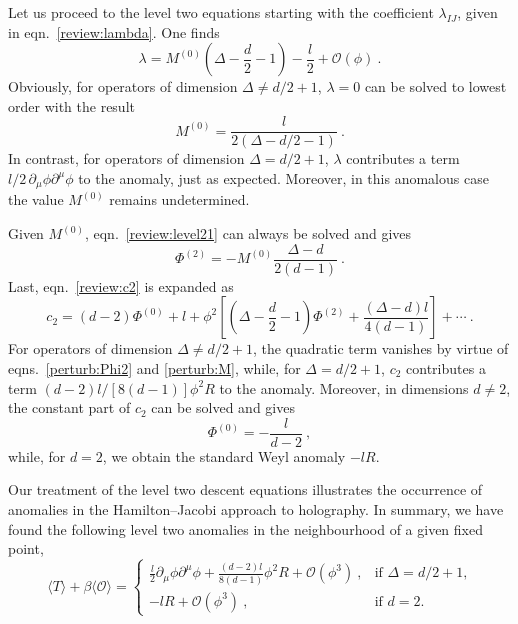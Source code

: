 \documentclass[a4paper,12pt]{article}
\begin{document}
Let us proceed to the level two equations starting with the
coefficient $\lambda_{IJ}$, given in eqn.\ \eqref{review:lambda}. One finds
\begin{equation}
\label{perturb:lambda}
  \lambda = M^{(0)} \left( \Delta-\frac{d}2 -1 \right) - \frac{l}2
  +\mathcal{O}(\phi)~.
\end{equation}
Obviously, for operators of dimension $\Delta \neq d/2+1$,
$\lambda=0$ can be solved to lowest order with the result
\begin{equation}
\label{perturb:M}
  M^{(0)} = \frac{l}{2(\Delta-d/2-1)}~.
\end{equation}
In contrast, for operators of dimension $\Delta=d/2+1$, $\lambda$
contributes a term $l/2\, \partial_\mu \phi \partial^\mu \phi$ to the
anomaly, just as expected. Moreover, in this anomalous case the value
$M^{(0)}$ remains undetermined.

Given $M^{(0)}$, eqn.\ \eqref{review:level21} can always be solved and gives
\begin{equation}
\label{perturb:Phi2}
  \Phi^{(2)} = -M^{(0)} \frac{\Delta-d}{2(d-1)}~.
\end{equation}
Last, eqn.\ \eqref{review:c2} is expanded as
\begin{equation}
\label{perturb:c2}
  c_2 = (d-2) \Phi^{(0)} +l + \phi^2 \left[
  \left(\Delta-\frac{d}2-1\right) \Phi^{(2)} + \frac{(\Delta-d)l}{4(d-1)} 
  \right] +\cdots~.
\end{equation}
For operators of dimension $\Delta\neq d/2+1$, the quadratic term vanishes
by virtue of eqns.\ \eqref{perturb:Phi2} and \eqref{perturb:M}, while, for
$\Delta=d/2+1$, $c_2$ contributes a term $(d-2)l/[8(d-1)] \phi^2 R$ to
the anomaly.
Moreover, in dimensions $d\neq 2$, the constant part of $c_2$ can be
solved and gives
\begin{equation}
\label{perturb:Phi0} 
  \Phi^{(0)} = -\frac{l}{d-2}~,
\end{equation}
while, for $d=2$, we obtain the standard Weyl anomaly $-lR$. 

Our treatment of the level two descent equations 
illustrates the occurrence of anomalies in the Hamilton--Jacobi
approach to holography. In summary, we have found the following level
two anomalies in the neighbourhood of a given fixed point,
\begin{equation}
\label{perturb:anom2}
  \langle T \rangle +\beta \langle \mathcal{O}\rangle = \begin{cases}
  \frac{l}2 \partial_\mu \phi \partial^\mu \phi +
  \frac{(d-2)l}{8(d-1)} \phi^2 R +\mathcal{O}(\phi^3)~, &\text{if
  $\Delta=d/2+1$,}\\  
  -lR +\mathcal{O}(\phi^3)~, &\text{if $d=2$.}
  \end{cases}
\end{equation}
\end{document}
